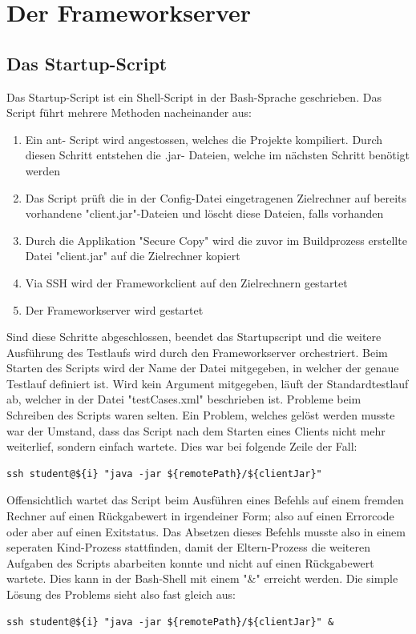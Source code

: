 \section{Der Frameworkserver}
\label{sec:test-FW Server}
\subsection{Das Startup-Script}
\label{sec:startupScript}
Das  Startup-Script ist ein Shell-Script in der Bash-Sprache geschrieben. Das Script führt mehrere Methoden nacheinander aus:
\begin{enumerate}
\item Ein ant- Script wird an\-ge\-stos\-sen, wel\-ches die Pro\-jek\-te kom\-pi\-liert. Durch die\-sen Schritt ent\-stehen die .jar- Dateien, welche im nächs\-ten Schritt benötigt werden
\item Das Script prüft die in der Config-Datei eingetragenen Zielrechner auf bereits vorhandene "client.jar"-Dateien und löscht diese Dateien, falls vorhanden
\item Durch die Applikation "Secure Copy" wird die zuvor im Buildprozess erstellte Datei "client.jar" auf die Zielrechner kopiert
\item Via SSH wird der Frameworkclient auf den Zielrechnern gestartet
\item Der Frameworkserver wird gestartet
\end{enumerate}
Sind diese Schritte abgeschlossen, beendet das Startupscript und die weitere Ausführung des Testlaufs wird durch den Frameworkserver orchestriert.
Beim Starten des Scripts wird der Name der Datei mitgegeben, in welcher der genaue Testlauf definiert ist. Wird kein Argument mitgegeben, läuft der Standardtestlauf ab, welcher in der Datei "testCases.xml" beschrieben ist.
Probleme beim Schreiben des Scripts waren selten. Ein Problem, welches gelöst werden musste war der Umstand, dass das Script nach dem Starten eines Clients nicht mehr weiterlief, sondern einfach wartete. Dies war bei folgende Zeile der Fall:
\begin{lstlisting}[breaklines=true]
 ssh student@${i} "java -jar ${remotePath}/${clientJar}"
\end{lstlisting}	
Offensichtlich wartet das Script beim Ausführen eines Befehls auf einem fremden Rechner auf einen Rückgabewert in irgendeiner Form; also auf einen Errorcode oder aber auf einen Exitstatus. Das Absetzen dieses Befehls musste also in einem seperaten Kind-Prozess stattfinden, damit der Eltern-Prozess die weiteren Aufgaben des Scripts abarbeiten konnte und nicht auf einen Rückgabewert wartete. Dies kann in der Bash-Shell mit einem "\&" erreicht werden. Die simple Lösung des Problems sieht also fast gleich aus:
\begin{lstlisting}[breaklines=true]
 ssh student@${i} "java -jar ${remotePath}/${clientJar}" &
\end{lstlisting}

